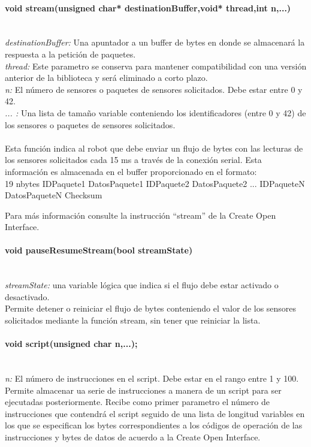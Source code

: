 \documentclass[letterpaper,openright,12pt]{book}
\begin{document}
\paragraph{void stream(unsigned char* destinationBuffer,void* thread,int n,...)}\mbox{}\\
\emph{destinationBuffer: } Una apuntador a un buffer de bytes en donde se almacenará la respuesta  a la petición de paquetes.\\
\emph{thread: } Este parametro se conserva para mantener compatibilidad con una versión anterior de la biblioteca y será eliminado a corto plazo.\\
\emph{n: } El número de sensores o paquetes de sensores solicitados. Debe estar entre 0 y 42.\\
\emph{... :} Una lista de tamaño variable conteniendo los identificadores (entre 0 y 42) de los sensores o paquetes de sensores solicitados.\\\\

Esta función indica al robot que debe enviar un flujo de bytes con las lecturas de los sensores solicitados cada 15 ms a través de la conexión serial. Esta información es almacenada en el buffer proporcionado en el formato:\\

19 nbytes IDPaquete1 DatosPaquete1 IDPaquete2 DatosPaquete2 ... IDPaqueteN DatosPaqueteN Checksum

Para más información consulte la instrucción ``stream'' de la Create Open Interface.\\

\paragraph{void pauseResumeStream(bool streamState)}\mbox{}\\
\emph{streamState: } una variable lógica que indica si el flujo debe estar activado o desactivado.\\
Permite detener o reiniciar el flujo de bytes conteniendo el valor de los sensores solicitados mediante la función stream, sin tener que reiniciar la lista.\\
\paragraph{void script(unsigned char n,...);}\mbox{}\\
\emph{n: }El número de instrucciones en el script. Debe estar en el rango entre 1 y 100.\\
Permite almacenar ua serie de instrucciones a manera de un script para ser ejecutadas posteriormente. Recibe como primer parametro el número de instrucciones que contendrá el script seguido de una lista de longitud variables en los que se especifican los bytes correspondientes a los códigos de operación de las instrucciones y bytes de datos de acuerdo a la Create Open Interface.\\
\end{document}
